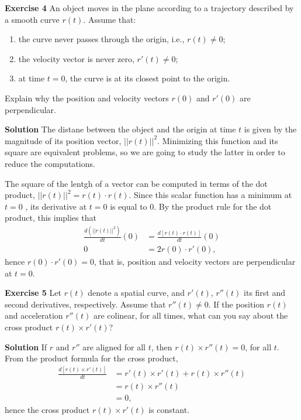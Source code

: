 \documentclass[12pt,oneside]{exam}
\newenvironment{exercise}[1]{\vspace{.1in}\noindent\textbf{Exercise #1 \hspace{.05em}}}{}
\newenvironment{newsolution}{\vspace{.1in}\noindent\textbf{Solution \hspace{.05em}}}{}
\begin{document}
\begin{exercise}{4}
An object moves in the plane according to a trajectory described by a smooth curve $r(t)$. Assume that:
\begin{enumerate}
\item the curve never passes through the origin, i.e., $r(t) \neq 0$; 
\item the velocity vector is never zero, $r'(t) \neq 0$;
\item  at time $t=0$, the curve is at its closest point to the origin.
\end{enumerate}

Explain why the position and velocity vectors $r(0)$ and $r'(0)$ are perpendicular. 
\end{exercise}

\begin{newsolution}
The distane between the object and the origin at time $t$ is given  by the magnitude of its position vector, $||r(t)||^2$. Minimizing this function and its square are equivalent problems, so we are going to study the latter in order to reduce the computations. 

The square of the lentgh of a vector can be computed in terms of the dot product, $||r(t)||^2=r(t) \cdot r(t)$. Since this scalar function has a minimum at $t=0$ , its derivative at $t=0$ is equal to $0$. By the product rule for the dot product, this implies that 
\begin{align*}
\frac{d(||r(t)||^2)}{dt} (0) & = \frac{d[r(t)\cdot r(t)]}{dt}(0) \\
0 & = 2r(0)\cdot r'(0), 
\end{align*}
hence $r(0) \cdot r'(0) = 0$, that is, position and velocity vectors are perpendicular at $t=0$. 
\end{newsolution}

\begin{exercise}{5}
Let $r(t)$ denote a spatial curve, and $r'(t)$, $r''(t)$ its first and second derivatives, respectively. Assume that $r''(t) \neq 0$. If the position $r(t)$ and acceleration $r''(t)$ are colinear, for all times, what can you say about the cross product $r(t) \times r'(t)$? 
\end{exercise}

\begin{newsolution}
If $r$ and $r''$ are aligned for all $t$, then $r(t) \times r''(t) = 0$, for all $t$. From the product formula for the cross product, 
\begin{align*}
\frac{d [r(t) \times r'(t)]}{dt} & = r'(t) \times r'(t) + r(t) \times r''(t) \\
 & =  r(t) \times r''(t)\\
 & = 0, 
\end{align*}
hence the cross product $r(t)\times r'(t)$ is constant.
\end{newsolution}
\end{document}
